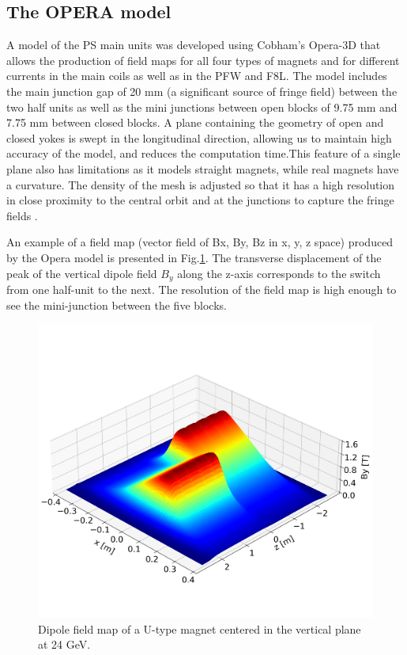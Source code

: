 \documentclass[a4paper,
               biblatex,     %
               keeplastbox,   %
               ]{jacow}
\begin{document}
\subsection{The OPERA model}
A model of the PS main units was developed using Cobham's Opera-3D that allows the production of field maps for all four types of magnets and for different currents in the main coils as well as in the PFW and F8L. The model includes the main junction gap of 20 mm (a significant source of fringe field) between the two half units as well as the mini junctions between open blocks of 9.75 mm and 7.75 mm between closed blocks. A plane containing the geometry of open and closed yokes is swept in the longitudinal direction, allowing us to maintain high accuracy of the model, and reduces the computation time.This feature of a single plane also has limitations as it models straight magnets, while real magnets have a curvature. The density of the mesh is adjusted so that it has a high resolution in close proximity to the central orbit and at the junctions to capture the fringe fields \cite{anglada_reference_2019}.

An example of a field map (vector field of Bx, By, Bz in x, y, z space) produced by the Opera model is presented in Fig.\ref{fig:dipole_field}. The transverse displacement of the peak of the vertical dipole field $B_{y}$ along the z-axis corresponds to the switch from one half-unit to the next. The resolution of the field map is high enough to see the mini-junction between the five blocks.

\begin{figure}[!htb]
   \centering
   \includegraphics*[width=1.0\columnwidth, trim={0 2.9cm 0 4.3cm},clip]{MOPOTK030_f3.png}
   \caption{Dipole field map of a U-type magnet centered in the vertical plane at 24 GeV.}
   \label{fig:dipole_field}
\end{figure}
\end{document}
